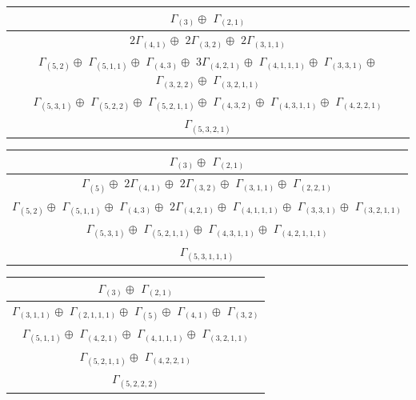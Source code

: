 \documentclass[main.tex]{subfiles}
\begin{document}
\begin{minipage}{.8\textwidth}
\centering
\begin{tabular}{c}
$\Gamma_{(
3
)} \oplus$
$\Gamma_{(
2 , 
1
)}$
\\ \hline
$2\Gamma_{(
4 , 
1
)} \oplus$
$2\Gamma_{(
3 , 
2
)} \oplus$
$2\Gamma_{(
3 , 
1 , 
1
)}$
\\ \hline
$\Gamma_{(
5 , 
2
)} \oplus$
$\Gamma_{(
5 , 
1 , 
1
)} \oplus$
$\Gamma_{(
4 , 
3
)} \oplus$
$3\Gamma_{(
4 , 
2 , 
1
)} \oplus$
$\Gamma_{(
4 , 
1 , 
1 , 
1
)} \oplus$
$\Gamma_{(
3 , 
3 , 
1
)} \oplus$
$\Gamma_{(
3 , 
2 , 
2
)} \oplus$
$\Gamma_{(
3 , 
2 , 
1 , 
1
)}$
\\ \hline
$\Gamma_{(
5 , 
3 , 
1
)} \oplus$
$\Gamma_{(
5 , 
2 , 
2
)} \oplus$
$\Gamma_{(
5 , 
2 , 
1 , 
1
)} \oplus$
$\Gamma_{(
4 , 
3 , 
2
)} \oplus$
$\Gamma_{(
4 , 
3 , 
1 , 
1
)} \oplus$
$\Gamma_{(
4 , 
2 , 
2 , 
1
)}$
\\ \hline
$\Gamma_{(
5 , 
3 , 
2 , 
1
)}$
\\
\end{tabular}\end{minipage}
\bigskip
\begin{minipage}{.65\textwidth}
\centering
\begin{tabular}{c}
$\Gamma_{(
3
)} \oplus$
$\Gamma_{(
2 , 
1
)}$
\\ \hline
$\Gamma_{(
5
)} \oplus$
$2\Gamma_{(
4 , 
1
)} \oplus$
$2\Gamma_{(
3 , 
2
)} \oplus$
$\Gamma_{(
3 , 
1 , 
1
)} \oplus$
$\Gamma_{(
2 , 
2 , 
1
)}$
\\ \hline
$\Gamma_{(
5 , 
2
)} \oplus$
$\Gamma_{(
5 , 
1 , 
1
)} \oplus$
$\Gamma_{(
4 , 
3
)} \oplus$
$2\Gamma_{(
4 , 
2 , 
1
)} \oplus$
$\Gamma_{(
4 , 
1 , 
1 , 
1
)} \oplus$
$\Gamma_{(
3 , 
3 , 
1
)} \oplus$
$\Gamma_{(
3 , 
2 , 
1 , 
1
)}$
\\ \hline
$\Gamma_{(
5 , 
3 , 
1
)} \oplus$
$\Gamma_{(
5 , 
2 , 
1 , 
1
)} \oplus$
$\Gamma_{(
4 , 
3 , 
1 , 
1
)} \oplus$
$\Gamma_{(
4 , 
2 , 
1 , 
1 , 
1
)}$
\\ \hline
$\Gamma_{(
5 , 
3 , 
1 , 
1 , 
1
)}$
\\
\end{tabular}\end{minipage}
\begin{minipage}{.35\textwidth}
\centering
\begin{tabular}{c}
$\Gamma_{(
3
)} \oplus$
$\Gamma_{(
2 , 
1
)}$
\\ \hline
$\Gamma_{(
3 , 
1 , 
1
)} \oplus$
$\Gamma_{(
2 , 
1 , 
1 , 
1
)} \oplus$
$\Gamma_{(
5
)} \oplus$
$\Gamma_{(
4 , 
1
)} \oplus$
$\Gamma_{(
3 , 
2
)}$
\\ \hline
$\Gamma_{(
5 , 
1 , 
1
)} \oplus$
$\Gamma_{(
4 , 
2 , 
1
)} \oplus$
$\Gamma_{(
4 , 
1 , 
1 , 
1
)} \oplus$
$\Gamma_{(
3 , 
2 , 
1 , 
1
)}$
\\ \hline
$\Gamma_{(
5 , 
2 , 
1 , 
1
)} \oplus$
$\Gamma_{(
4 , 
2 , 
2 , 
1
)}$
\\ \hline
$\Gamma_{(
5 , 
2 , 
2 , 
2
)}$
\\
\end{tabular}\end{minipage}
\end{document}
